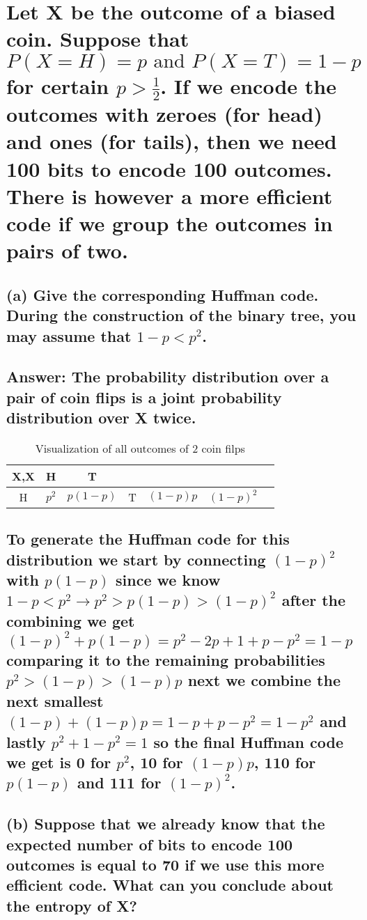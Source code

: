 \documentclass[15px]{article}
\begin{document}
\section{\normalfont Let X be the outcome of a biased coin. Suppose that \(P(X = H)=p \text{ and } P(X = T)=1-p\) for certain \(p>\frac{1}{2}\). If we encode the outcomes with zeroes (for head) and ones (for tails), then we need 100 bits to encode 100 outcomes. There is however a more efficient code if we group the outcomes in pairs of two.}

\subsection*{\normalfont (a) Give the corresponding Huffman code. During the construction of the binary tree, you may assume that \(1-p < p^2\).}

\subsection*{Answer: The probability distribution over a pair of coin flips is a joint probability distribution over X twice.}

\begin{table}[t]
\centering
\begin{adjustbox}{width=0.5\linewidth}
\begin{tabular}{|c|c|c|}
\hline
X,X & H & T \\ \hline
H & \(p^2\) & \(p(1-p)\) &  \hline
T & \((1-p)p\) & \((1-p)^2\) & \hline
\end{tabular}
\end{adjustbox}
\caption{Visualization of all outcomes of 2 coin filps} 
\end{table}

\subsection*{To generate the Huffman code for this distribution we start by connecting \((1-p)^2\) with \(p(1-p)\) since we know \(1-p<p^2 \longrightarrow p^2>p(1-p)>(1-p)^2\) after the combining we get \((1-p)^2+p(1-p)=p^2-2p+1+p-p^2 = 1-p\) comparing it to the remaining probabilities \(p^2>(1-p)>(1-p)p\) next we combine the next smallest \((1-p)+(1-p)p=1-p+p-p^2=1-p^2\) and lastly \(p^2 +1-p^2=1\) so the final Huffman code we get is 0 for \(p^2\), 10 for \((1-p)p\), 110 for \(p(1-p)\) and 111 for \((1-p)^2\).}

\subsection*{\normalfont (b) Suppose that we already know that the expected number of bits to encode 100 outcomes is equal to 70 if we use this more efficient code. What can you conclude about the entropy of X?}
\end{document}
